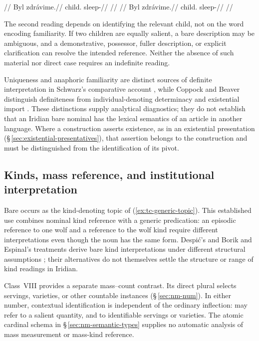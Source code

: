 \pex\label{ex:nm-contextual-reference}
\a
\begingl
\glpreamble {}//
\gla Byl zdrávime.//
\glb child.\Dir{} sleep-\Prog{}//
\glft {}//
\endgl
\a
\begingl
\glpreamble {}//
\gla Byl zdrávime.//
\glb child.\Dir{} sleep-\Prog{}//
\glft {}//
\endgl
\xe

The second reading depends on identifying the relevant child, not on the
word  encoding familiarity. If two children are equally salient,
a bare description may be ambiguous, and a demonstrative, possessor, fuller
description, or explicit clarification can resolve the intended reference.
Neither the absence of such material nor direct case requires an indefinite
reading.

Uniqueness and anaphoric familiarity are distinct sources of definite
interpretation in Schwarz's comparative account
\cite[§§\,2.1, 2.3--2.4]{schwarz2019}, while Coppock and Beaver distinguish
definiteness from individual-denoting determinacy and existential import
\cite[§§\,1--2]{coppockbeaver2015}. These distinctions supply analytical
diagnostics; they do not establish that an Iridian bare nominal has the
lexical semantics of an article in another language. Where a construction
asserts existence, as in an existential presentation
(§\,\ref{sec:existential-presentatives}), that assertion belongs to the
construction and must be distinguished from the identification of its pivot.

\subsection{Kinds, mass reference, and institutional interpretation}
\label{sec:nm-kinds-mass}

Bare   occurs as the kind-denoting topic of
 
(\ref{ex:tc-generic-topic}). This established use combines nominal kind
reference with a generic predication: an episodic reference to one wolf and
a reference to the wolf kind require different interpretations even though
the noun has the same form. Despić's and Borik and Espinal's treatments
derive bare kind interpretations under different structural assumptions
\cite{despic2019,borikespinal2019}; their alternatives do not themselves
settle the structure or range of kind readings in Iridian.

Class~VIII   provides a separate mass--count contrast.
Its direct plural  selects servings, varieties, or other countable
instances (§\,\ref{sec:nm-num}). In either number, contextual identification
is independent of the ordinary inflection:  may refer to a
salient quantity, and  to identifiable servings or varieties.
The atomic cardinal schema in §\,\ref{sec:nm-semantic-types} supplies no
automatic analysis of mass measurement or mass-kind reference.

